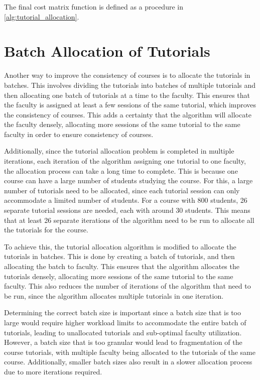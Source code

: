 The final cost matrix function is defined as a procedure in \autoref{alg:tutorial_allocation}.

\section{Batch Allocation of Tutorials}

Another way to improve the consistency of courses is to allocate the tutorials in batches. This involves dividing the tutorials into batches of multiple tutorials and then allocating one batch of tutorials at a time to the faculty. This ensures that the faculty is assigned at least a few sessions of the same tutorial, which improves the consistency of courses. This adds a certainty that the algorithm will allocate the faculty densely, allocating more sessions of the same tutorial to the same faculty in order to ensure consistency of courses.

Additionally, since the tutorial allocation problem is completed in multiple iterations, each iteration of the algorithm assigning one tutorial to one faculty, the allocation process can take a long time to complete. This is because one course can have a large number of students studying the course. For this, a large number of tutorials need to be allocated, since each tutorial session can only accommodate a limited number of students. For a course with 800 students, 26 separate tutorial sessions are needed, each with around 30 students. This means that at least 26 separate iterations of the algorithm need to be run to allocate all the tutorials for the course.

To achieve this, the tutorial allocation algorithm is modified to allocate the tutorials in batches. This is done by creating a batch of tutorials, and then allocating the batch to faculty. This ensures that the algorithm allocates the tutorials densely, allocating more sessions of the same tutorial to the same faculty. This also reduces the number of iterations of the algorithm that need to be run, since the algorithm allocates multiple tutorials in one iteration.

Determining the correct batch size is important since a batch size that is too large would require higher workload limits to accommodate the entire batch of tutorials, leading to unallocated tutorials and sub-optimal faculty utilization. However, a batch size that is too granular would lead to fragmentation of the course tutorials, with multiple faculty being allocated to the tutorials of the same course. Additionally, smaller batch sizes also result in a slower allocation process due to more iterations required.

